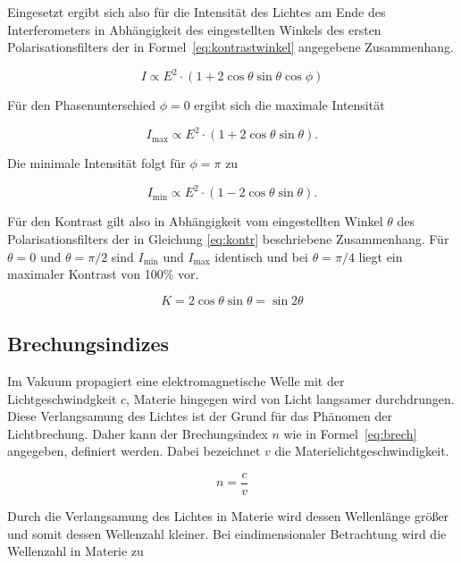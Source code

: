 Eingesetzt ergibt sich also für die Intensität des Lichtes am Ende des Interferometers in Abhängigkeit des
eingestellten Winkels des ersten Polarisationsfilters der in Formel~\eqref{eq:kontrastwinkel} angegebene Zusammenhang.

\begin{equation}
I \propto E^2\cdot(1 + 2\cos \theta \sin \theta \cos \phi)
\label{eq:kontrastwinkel}
\end{equation}

Für den Phasenunterschied $\phi = 0$ ergibt sich die maximale Intensität

\begin{equation}
I_\text{max} \propto E^2\cdot(1 + 2\cos \theta \sin \theta).
\label{eq:intens_max}
\end{equation}

Die minimale Intensität folgt für $\phi = \pi$ zu

\begin{equation}
I_\text{min} \propto E^2\cdot(1 - 2\cos \theta \sin \theta).
\label{eq:intens_min}
\end{equation}

Für den Kontrast gilt also in Abhängigkeit vom eingestellten Winkel $\theta$ des Polarisationsfilters der in Gleichung \eqref{eq:kontr} beschriebene Zusammenhang. Für $\theta = 0$ und $\theta = \pi/2$ sind $I_\text{min}$ und $I_\text{max}$ identisch und bei $\theta = \pi/4$ liegt ein maximaler Kontrast von 100\% vor.

\begin{equation}
	K = 2 \cos \theta \sin \theta = \sin 2\theta
	\label{eq:kontr}
\end{equation}


\subsection{Brechungsindizes}
Im Vakuum propagiert eine elektromagnetische Welle mit der Lichtgeschwindgkeit $c$, Materie hingegen wird von Licht langsamer durchdrungen. Diese Verlangsamung des Lichtes ist der Grund für das Phänomen der Lichtbrechung. Daher kann der Brechungsindex $n$ wie in Formel~\eqref{eq:brech} angegeben, definiert werden. Dabei bezeichnet $v$ die Materielichtgeschwindigkeit.

\begin{equation}
n = \frac{c}{v}
\label{eq:brech}
\end{equation}

Durch die Verlangsamung des Lichtes in Materie wird dessen Wellenlänge größer und somit dessen Wellenzahl kleiner. Bei eindimensionaler Betrachtung wird die Wellenzahl in Materie zu


